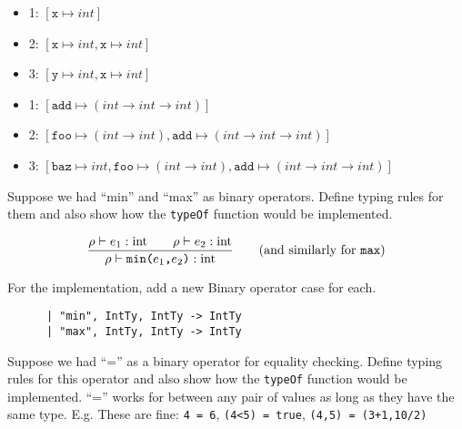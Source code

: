 \documentclass[addpoints]{exam}
\newcommand{\TJDG}[3]{#1 \vdash #2 : #3}
\begin{document}
\begin{questions}
\begin{minipage}{0.65\textwidth}
    \begin{solutionbox}{3cm}
      \begin{itemize}
      \item 1: $[\texttt{x}\mapsto int]$
      \item 2: $[\texttt{x}\mapsto int, \texttt{x}\mapsto int]$
      \item 3: $[\texttt{y}\mapsto int, \texttt{x}\mapsto int]$
      \end{itemize}
    \end{solutionbox}

    \begin{solutionbox}{3cm}
      \begin{itemize}
      \item 1: $[\texttt{add}\mapsto (int \to int \to int)]$
      \item 2: $[\texttt{foo}\mapsto (int \to int), \texttt{add}\mapsto (int \to int \to int)]$
      \item 3: $[\texttt{baz} \mapsto int, \texttt{foo}\mapsto (int \to int), \texttt{add}\mapsto (int \to int \to int)]$
      \end{itemize}
    \end{solutionbox}
  \end{minipage}

  
  \question
  Suppose we had ``min'' and ``max'' as binary operators.
  Define typing rules for them and
  also show how the \texttt{typeOf} function would be implemented.

  \begin{solutionbox}{4cm}
    \[
    \frac{\TJDG{\rho}{e_1}{\mathrm{int}} \qquad \TJDG{\rho}{e_2}{\mathrm{int}}}
         {\TJDG{\rho}{\texttt{min($e_1$,$e_2$)}}{\mathrm{int}}}
         \qquad \textrm{(and similarly for \texttt{max})}
    \]

    For the implementation, add a new Binary operator case for each.

    \begin{verbatim}
      | "min", IntTy, IntTy -> IntTy
      | "max", IntTy, IntTy -> IntTy
    \end{verbatim}
  \end{solutionbox}
  
  \question
  Suppose we had ``='' as a binary operator for equality checking.
  Define typing rules for this operator and
  also show how the \texttt{typeOf} function would be implemented.
  ``='' works for between any pair of values as long as they have the same type.
  E.g. These are fine: \texttt{4 = 6}, \texttt{(4<5) = true}, \texttt{(4,5) = (3+1,10/2)}


\end{questions}
\end{document}
